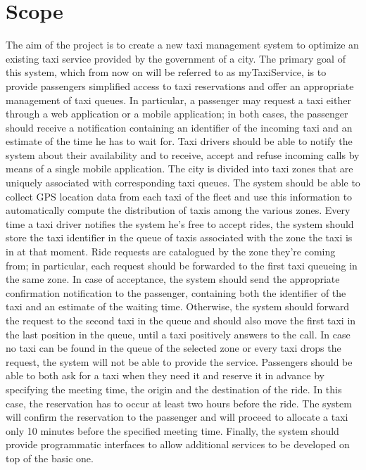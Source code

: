 \section{Scope}
The aim of the project is to create a new taxi management system to optimize an existing taxi service provided by the government of a city. The primary goal of this system, which from now on will be referred to as myTaxiService, is to provide passengers simplified access to taxi reservations and offer an appropriate management of taxi queues. In particular, a passenger may request a taxi either through a web application or a mobile application; in both cases, the passenger should receive a notification containing an identifier of the incoming taxi and an estimate of the time he has to wait for. Taxi drivers should be able to notify the system about their availability and to receive, accept and refuse incoming calls by means of a single mobile application. The city is divided into taxi zones that are uniquely associated with corresponding taxi queues. The system should be able to collect GPS location data from each taxi of the fleet and use this information to automatically compute the distribution of taxis among the various zones. Every time a taxi driver notifies the system he's free to accept rides, the system should store the taxi identifier in the queue of taxis associated with the zone the taxi is in at that moment. Ride requests are catalogued by the zone they’re coming from; in particular, each request should be forwarded to the first taxi queueing in the same zone. In case of acceptance, the system should send the appropriate confirmation notification to the passenger, containing both the identifier of the taxi and an estimate of the waiting time. Otherwise, the system should forward the request to the second taxi in the queue and should also move the first taxi in the last position in the queue, until a taxi positively answers to the call. In case no taxi can be found in the queue of the selected zone or every taxi drops the request, the system will not be able to provide the service. Passengers should be able to both ask for a taxi when they need it and reserve it in advance by specifying the meeting time, the origin and the destination of the ride. In this case, the reservation has to occur at least two hours before the ride. The system will confirm the reservation to the passenger and will proceed to allocate a taxi only 10 minutes before the specified meeting time. Finally, the system should provide programmatic interfaces to allow additional services to be developed on top of the basic one.


